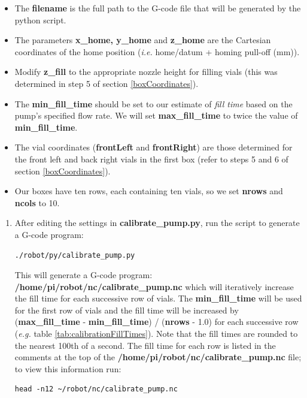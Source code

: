 \documentclass[]{book}
\providecommand{\tightlist}{%
  \setlength{\itemsep}{0pt}\setlength{\parskip}{0pt}}
\theoremstyle{definition}
\theoremstyle{definition}
\theoremstyle{definition}
\theoremstyle{remark}
\begin{document}
\begin{itemize}
\tightlist
\item
  The \textbf{filename} is the full path to the G-code file that will be
  generated by the python script.
\item
  The parameters \textbf{x\_home, y\_home} and \textbf{z\_home} are the
  Cartesian coordinates of the home position (\emph{i.e.} home/datum +
  homing pull-off (mm)).
\item
  Modify \textbf{z\_fill} to the appropriate nozzle height for filling
  vials (this was determined in step 5 of section \ref{boxCoordinates}).
\item
  The \textbf{min\_fill\_time} should be set to our estimate of
  \emph{fill time} based on the pump's specified flow rate. We will set
  \textbf{max\_fill\_time} to twice the value of
  \textbf{min\_fill\_time}.
\item
  The vial coordinates (\textbf{frontLeft} and \textbf{frontRight}) are
  those determined for the front left and back right vials in the first
  box (refer to steps 5 and 6 of section \ref{boxCoordinates}).
\item
  Our boxes have ten rows, each containing ten vials, so we set
  \textbf{nrows} and \textbf{ncols} to 10.
\end{itemize}

\begin{enumerate}
\def\labelenumi{\arabic{enumi}.}
\setcounter{enumi}{2}
\item
  After editing the settings in \textbf{calibrate\_pump.py}, run the
  script to generate a G-code program:

\begin{verbatim}
./robot/py/calibrate_pump.py
\end{verbatim}

  This will generate a G-code program:
  \textbf{/home/pi/robot/nc/calibrate\_pump.nc} which will iteratively
  increase the fill time for each successive row of vials. The
  \textbf{min\_fill\_time} will be used for the first row of vials and
  the fill time will be increased by (\textbf{max\_fill\_time} -
  \textbf{min\_fill\_time}) / (\textbf{nrows} - 1.0) for each successive
  row (\emph{e.g.} table \ref{tab:calibrationFillTimes}). Note that the
  fill times are rounded to the nearest 100th of a second. The fill time
  for each row is listed in the comments at the top of the
  \textbf{/home/pi/robot/nc/calibrate\_pump.nc} file; to view this
  information run:

\begin{verbatim}
head -n12 ~/robot/nc/calibrate_pump.nc
\end{verbatim}
\end{enumerate}
\end{document}
